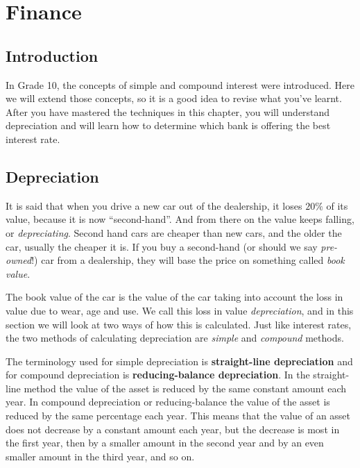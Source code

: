 \chapter{Finance}
\label{m:f11}

\section{Introduction}
In Grade 10, the concepts of simple and compound interest were
introduced. Here we will extend those concepts, so it is a good idea to
revise what you've learnt. After you have mastered the techniques in this
chapter, you will understand depreciation and will learn how to
determine which bank is offering the best interest rate.


\section{Depreciation}

It is said that when you drive a new car out of the dealership, it loses $20\%$ of its value, because it is now ``second-hand''. And from there on the value keeps falling, or \textit{depreciating}. Second hand cars are cheaper than new cars, and the older the car, usually the cheaper it is. If you buy a second-hand (or should we say \textit{pre-owned}!) car from a dealership, they will base the price on something called \textit{book value}.

The book value of the car is the value of the car taking into account the loss in value due to wear, age and use. We call this loss in value \textit{depreciation}, and in this section we will look at two ways of how this is calculated. Just like interest rates, the two methods of calculating depreciation are \textit{simple} and \textit{compound} methods.

The terminology used for simple depreciation is \textbf{straight-line depreciation} and for compound depreciation is \textbf{reducing-balance depreciation}.  In the straight-line method the value of the asset is reduced by the same constant amount each year. In compound depreciation or reducing-balance the value of the asset is reduced by the same percentage each year. This means that the value of an asset does not decrease by a constant amount each year, but the decrease is most in the first year, then by a smaller amount in the second year and by an even smaller amount in the third year, and so on.

